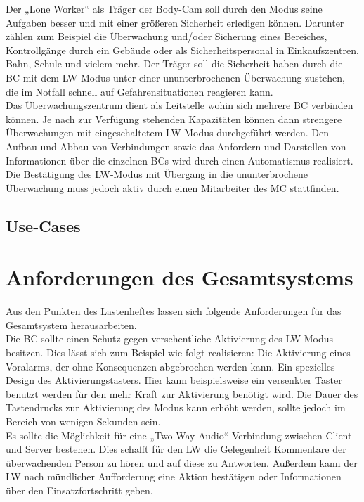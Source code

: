 \documentclass[thesis.tex]{subfiles}
\begin{document}
Der „Lone Worker“ als Träger der Body-Cam soll durch den Modus seine Aufgaben besser und mit einer größeren Sicherheit erledigen können.
Darunter zählen zum Beispiel die Überwachung und/oder Sicherung eines Bereiches, Kontrollgänge durch ein Gebäude oder
als Sicherheitspersonal in Einkaufszentren, Bahn, Schule und vielem mehr.
Der Träger soll die Sicherheit haben durch die BC mit dem LW-Modus unter einer ununterbrochenen Überwachung zustehen,
die im Notfall schnell auf Gefahrensituationen reagieren kann.
\\

Das Überwachungszentrum dient als Leitstelle wohin sich mehrere BC verbinden können.
Je nach zur Verfügung stehenden Kapazitäten können dann strengere Überwachungen mit eingeschaltetem LW-Modus durchgeführt werden.
Den Aufbau und Abbau von Verbindungen sowie das Anfordern und Darstellen von Informationen über die einzelnen BCs wird
durch einen Automatismus realisiert.
Die Bestätigung des LW-Modus mit Übergang in die ununterbrochene Überwachung muss jedoch aktiv durch einen Mitarbeiter des MC stattfinden.
\\

\subsection{Use-Cases}
\section{Anforderungen des Gesamtsystems}
Aus den Punkten des Lastenheftes lassen sich folgende Anforderungen für das Gesamtsystem herausarbeiten.
\\

Die BC sollte einen Schutz gegen versehentliche Aktivierung des LW-Modus besitzen.
Dies lässt sich zum Beispiel wie folgt realisieren: Die Aktivierung eines Voralarms, der ohne Konsequenzen abgebrochen werden kann.
Ein spezielles Design des Aktivierungstasters. Hier kann beispielsweise ein versenkter Taster benutzt werden für den mehr Kraft zur
Aktivierung benötigt wird.
Die Dauer des Tastendrucks zur Aktivierung des Modus kann erhöht werden, sollte jedoch im Bereich von wenigen Sekunden sein.
\\

Es sollte die Möglichkeit für eine „Two-Way-Audio“-Verbindung zwischen Client und Server bestehen.
Dies schafft für den LW die Gelegenheit Kommentare der überwachenden Person zu hören und auf diese zu Antworten.
Außerdem kann der LW nach mündlicher Aufforderung eine Aktion bestätigen oder Informationen über den Einsatzfortschritt geben.
\\
\end{document}
